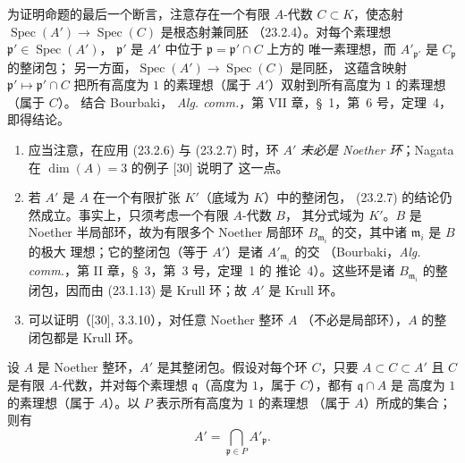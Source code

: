 为证明命题的最后一个断言，注意存在一个有限 $A$-代数
$C\subset K$，使态射
$\operatorname{Spec}(A')\to\operatorname{Spec}(C)$ 是根态射兼同胚
（23.2.4）。对每个素理想 $\mathfrak p'\in\operatorname{Spec}(A')$，
$\mathfrak p'$ 是 $A'$ 中位于 $\mathfrak p=\mathfrak p'\cap C$ 上方的
唯一素理想，而 $A'_{\mathfrak p'}$ 是 $C_{\mathfrak p}$ 的整闭包；
另一方面，$\operatorname{Spec}(A')\to\operatorname{Spec}(C)$ 是同胚，
这蕴含映射 $\mathfrak p'\mapsto\mathfrak p'\cap C$ 把所有高度为
$1$ 的素理想（属于 $A'$）双射到所有高度为 $1$ 的素理想（属于 $C$）。
结合 Bourbaki，
\emph{Alg. comm.}，第 VII 章，§~1，第~6 号，定理~4，即得结论。

\begin{remarks}[23.2.8]
\label{0.23.2.8-fr}
\begin{enumerate}
  \item[(i)] 应当注意，在应用 (23.2.6) 与 (23.2.7) 时，环 $A'$
  \emph{未必是 Noether 环}；Nagata 在 $\dim(A)=3$ 的例子 [30] 说明了
  这一点。

  \item[(ii)] 若 $A'$ 是 $A$ 在一个有限扩张 $K'$（底域为 $K$）中的整闭包，
  (23.2.7) 的结论仍然成立。事实上，只须考虑一个有限 $A$-代数 $B$，
  其分式域为 $K'$。$B$ 是 Noether 半局部环，故为有限多个 Noether
  局部环 $B_{\mathfrak m_i}$ 的交，其中诸 $\mathfrak m_i$ 是 $B$ 的极大
  理想；它的整闭包（等于 $A'$）是诸 $A'_{\mathfrak m_i}$ 的交
  （Bourbaki，\emph{Alg. comm.}，第 II 章，§~3，第~3 号，定理~1 的
  推论~4）。这些环是诸 $B_{\mathfrak m_i}$ 的整闭包，因而由 (23.1.13)
  是 Krull 环；故 $A'$ 是 Krull 环。

  \item[(iii)] 可以证明（[30], 3.3.10），对任意 Noether 整环 $A$
  （不必是局部环），$A$ 的整闭包都是 Krull 环。
\end{enumerate}
\end{remarks}

\begin{corollary}[23.2.9]
\label{0.23.2.9-fr}
设 $A$ 是 Noether 整环，$A'$ 是其整闭包。假设对每个环 $C$，只要
$A\subset C\subset A'$ 且 $C$ 是有限 $A$-代数，并对每个素理想
$\mathfrak q$（高度为 $1$，属于 $C$），都有 $\mathfrak q\cap A$ 是
高度为 $1$ 的素理想（属于 $A$）。以 $P$ 表示所有高度为 $1$ 的素理想
（属于 $A$）所成的集合；则有
\[
  A'=\bigcap_{\mathfrak p\in P}A'_{\mathfrak p}.
\]
\end{corollary}


